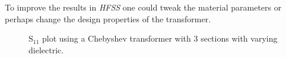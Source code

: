 \documentclass[12pt,a4paper]{article}
\begin{document}
To improve the results in \textit{HFSS} one could tweak the material parameters or perhaps change the design properties of the transformer.
\begin{figure}
  \centering
  \noindent{}
  \caption{$\text{S}_{11}$ plot using a Chebyshev transformer with 3 sections with varying dielectric.}
  \label{fig:var_diel_s11}
\end{figure}
\end{document}
